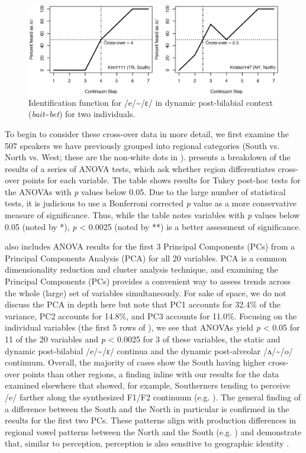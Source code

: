 \documentclass[output=paper]{LSP/langsci}
\begin{document}
\begin{figure}
\includegraphics[width=\textwidth]{illustrations/kend_frid_fig2}
\caption{Identification function for /e/{\textasciitilde}/ɛ/ in dynamic post-bilabial context (\textit{bait}{\textasciitilde}\textit{bet}) for two individuals.}
\label{fig:2}
\end{figure}

To begin to consider these cross-over data in more detail, we first examine the 507 speakers we have previously grouped into regional categories (South vs. North vs. West; these are the non-white dots in ).  presents a breakdown of the results of a series of ANOVA tests, which ask whether region differentiates cross-over points for each variable. The table shows results for Tukey post-hoc tests for the ANOVAs with \textit{p }values below 0.05. Due to the large number of statistical tests, it is judicious to use a Bonferroni corrected \textit{p }value as a more conservative measure of significance. Thus, while the table notes variables with \textit{p }values below 0.05 (noted by *), \textit{p }{\textless} 0.0025 (noted by **) is a better assessment of significance.

 also includes ANOVA results for the first 3 Principal Components (PCs) from a Principal Components Analysis (PCA) for all 20 variables. PCA is a common dimensionality reduction and cluster analysis technique, and examining the Principal Components (PCs) provides a convenient way to assess trends across the whole (large) set of variables simultaneously. For sake of space, we do not discuss the PCA in depth here but note that PC1 accounts for 32.4\% of the variance, PC2 accounts for 14.8\%, and PC3 accounts for 11.0\%. Focusing on the individual variables (the first 5 rows of ), we see that ANOVAs yield \textit{p }{\textless} 0.05 for 11 of the 20 variables and \textit{p }{\textless} 0.0025 for 3 of these variables, the static and dynamic post-bilabial /e/{\textasciitilde}/ɛ/ continua and the dynamic post-alveolar /ʌ/{\textasciitilde}/o/ continuum. Overall, the majority of cases show the South having higher cross-over points than other regions, a finding inline with our results for the data examined elsewhere that showed, for example, Southerners tending to perceive /e/ farther along the synthesized F1/F2 continuum (e.g. \citealt{kendall_variation_2012}). The general finding of a difference between the South and the North in particular is confirmed in the results for the first two PCs. These patterns align with production differences in regional vowel patterns between the North and the South (e.g. \citealt{labov_atlas_2006-1}) and demonstrate that, similar to perception, perception is also sensitive to geographic identity \citep{fridland_exploring_2012}.
\end{document}
